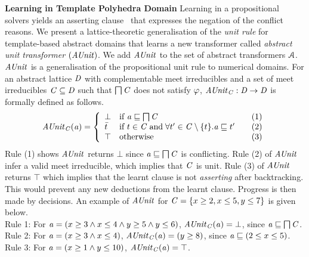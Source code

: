 \noindent \textbf{Learning in Template Polyhedra Domain}
%
Learning in a propositional solvers yields an asserting clause~\cite{cdcl}
that expresses the negation of the conflict reasons.  We present a
lattice-theoretic generalisation of the {\em unit rule} for template-based
abstract domains that learns a new transformer called {\em abstract unit
transformer} $(\mathit{AUnit})$.  We add $\mathit{AUnit}$ to the set of abstract
transformers $\mathcal{A}$.  $\mathit{AUnit}$ is a generalisation of the
propositional unit rule to numerical domains.  For an abstract lattice
$\mathit{D}$ with complementable meet irreducibles and a set of meet
irreducibles $\mathit{C} \subseteq \mathit{D}$ such that $\bigsqcap
\mathit{C}$ does not satisfy $\varphi$, $\mathit{AUnit}_{\mathit{C}}: \mathit{D}
\rightarrow \mathit{D}$ is formally defined as follows.
%
\[ \aunit_\conflictset(\absval) =
 \left\{\begin{array}{l@{\quad}l@{\qquad}l}
  \bot       & \text{if } \absval \sqsubseteq \bigsqcap \conflictset & (1)\\
  \bar{t}    & \text{if } t \in \conflictset \; \text{and} \; \forall t' \in \conflictset
  \setminus \{t\}. \absval  \sqsubseteq t' & (2) \\
  \top & \text{otherwise} & (3) \\
 \end{array}\right.
\]
%
Rule (1) shows $\mathit{AUnit}$ returns $\bot$ since $\mathit{a} \sqsubseteq \bigsqcap
\mathit{C}$ is conflicting.  Rule (2) of $\mathit{AUnit}$ infer a valid meet
irreducible, which implies that $\mathit{C}$ is unit.  Rule (3) of
$\mathit{AUnit}$ returns $\top$ which implies that the learnt clause is not {\em
asserting} after backtracking.  This would prevent any new deductions from
the learnt clause.  Progress is then made by decisions.  An example of
$\mathit{AUnit}$ for $\mathit{C} = \{x \geq 2, x \leq 5, y \leq 7 \}$ is given
below.  \\
%
Rule 1: 
For $\mathit{a} = (x \geq 3\wedge\allowbreak x \leq
4\wedge\allowbreak y \geq 5\wedge y \leq 6)$, 
$\mathit{AUnit}_{\mathit{C}}(\mathit{a}) = \bot$, since $\mathit{a}
\sqsubseteq \bigsqcap\mathit{C}$.  \\ 
Rule 2:  
For $\mathit{a} = (x \geq 3\wedge x \leq 4)$,  
$\mathit{AUnit}_{\mathit{C}}(\mathit{a}) = (y \geq 8)$, since
$\mathit{a} \sqsubseteq (2 \leq x \leq 5)$. \\ 
%
Rule 3: 
For $\mathit{a} = (x \geq 1\wedge y \leq 10)$, 
$\mathit{AUnit}_{\mathit{C}}(\mathit{a}) = \top$. \\



